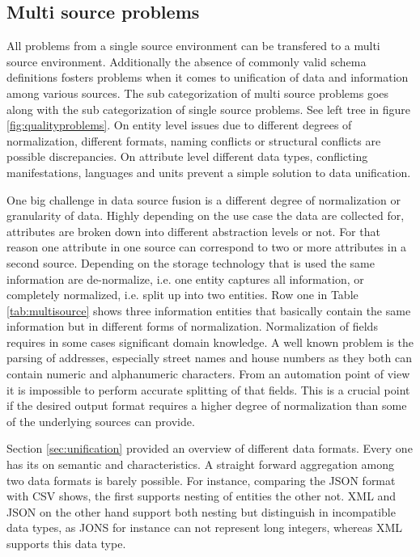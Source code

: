 \subsection{Multi source problems}
All problems from a single source environment can be transfered to a multi source environment. Additionally the absence of commonly valid schema definitions fosters problems when it comes to unification of data and information among various sources. The sub categorization of multi source problems goes along with the sub categorization of single source problems. See left tree in figure \ref{fig:qualityproblems}. On entity level issues due to different degrees of normalization, different formats, naming conflicts or structural conflicts are possible discrepancies. On attribute level different data types, conflicting manifestations, languages and units prevent a simple solution to data unification.

One big challenge in data source fusion is a different degree of normalization or granularity of data. Highly depending on the use case the data are collected for, attributes are broken down into different abstraction levels or not. For that reason one attribute in one source can correspond to two or more attributes in a second source. Depending on the storage technology that is used the same information are de-normalize, i.e. one entity captures all information, or completely normalized, i.e. split up into two entities. Row one in Table \ref{tab:multisource} shows three information entities that basically contain the same information but in different forms of normalization. Normalization of fields requires in some cases significant domain knowledge. A well known problem is the parsing of addresses, especially street names and house numbers as they both can contain numeric and alphanumeric characters. From an automation point of view it is impossible to perform accurate splitting of that fields. This is a crucial point if the desired output format requires a higher degree of normalization than some of the underlying sources can provide. 

Section \ref{sec:unification} provided an overview of different data formats. Every one has its on semantic and characteristics. A straight forward aggregation among two data formats is barely possible. For instance, comparing the JSON
format with CSV shows, the first supports nesting of entities the other not. XML and JSON on the other hand support both nesting
but distinguish in incompatible data types, as JONS for instance can not represent long integers, whereas XML supports this data type.

